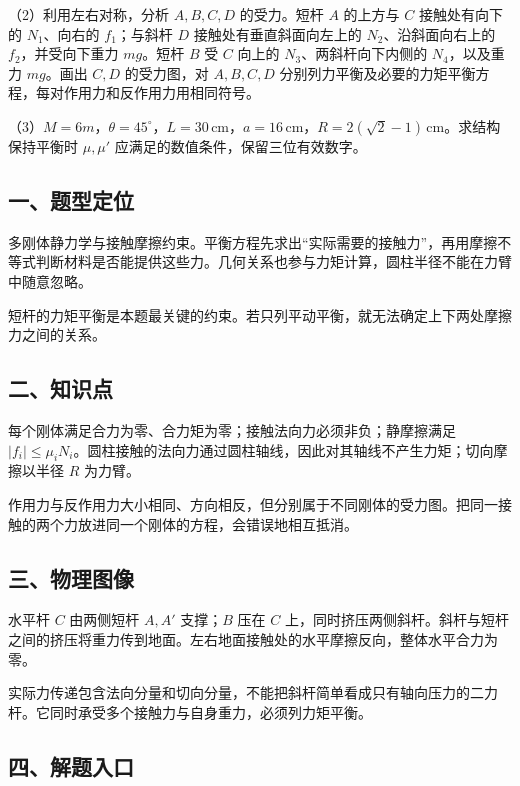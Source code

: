 \documentclass[12pt,a4paper,fontset=fandol]{ctexart}
\begin{document}
（2）利用左右对称，分析 \(A,B,C,D\) 的受力。短杆 \(A\) 的上方与 \(C\)
接触处有向下的 \(N_1\)、向右的 \(f_1\)；与斜杆 \(D\)
接触处有垂直斜面向左上的 \(N_2\)、沿斜面向右上的 \(f_2\)，并受向下重力
\(mg\)。短杆 \(B\) 受 \(C\) 向上的 \(N_3\)、两斜杆向下内侧的
\(N_4\)，以及重力 \(mg\)。画出 \(C,D\) 的受力图，对 \(A,B,C,D\)
分别列力平衡及必要的力矩平衡方程，每对作用力和反作用力用相同符号。

（3）\(M=6m\)，\(\theta=45^\circ\)，\(L=30\,\mathrm{cm}\)，\(a=16\,\mathrm{cm}\)，\(R=2(\sqrt2-1)\,\mathrm{cm}\)。求结构保持平衡时
\(\mu,\mu'\) 应满足的数值条件，保留三位有效数字。

\subsection{一、题型定位}\label{ux4e00ux9898ux578bux5b9aux4f4d-3}

多刚体静力学与接触摩擦约束。平衡方程先求出``实际需要的接触力''，再用摩擦不等式判断材料是否能提供这些力。几何关系也参与力矩计算，圆柱半径不能在力臂中随意忽略。

短杆的力矩平衡是本题最关键的约束。若只列平动平衡，就无法确定上下两处摩擦力之间的关系。

\subsection{二、知识点}\label{ux4e8cux77e5ux8bc6ux70b9-3}

每个刚体满足合力为零、合力矩为零；接触法向力必须非负；静摩擦满足
\(|f_i|\le\mu_iN_i\)。圆柱接触的法向力通过圆柱轴线，因此对其轴线不产生力矩；切向摩擦以半径
\(R\) 为力臂。

作用力与反作用力大小相同、方向相反，但分别属于不同刚体的受力图。把同一接触的两个力放进同一个刚体的方程，会错误地相互抵消。

\subsection{三、物理图像}\label{ux4e09ux7269ux7406ux56feux50cf-3}

水平杆 \(C\) 由两侧短杆 \(A,A'\) 支撑；\(B\) 压在 \(C\)
上，同时挤压两侧斜杆。斜杆与短杆之间的挤压将重力传到地面。左右地面接触处的水平摩擦反向，整体水平合力为零。

实际力传递包含法向分量和切向分量，不能把斜杆简单看成只有轴向压力的二力杆。它同时承受多个接触力与自身重力，必须列力矩平衡。

\subsection{四、解题入口}\label{ux56dbux89e3ux9898ux5165ux53e3-3}
\end{document}
